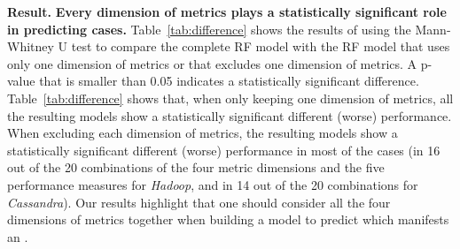 \noindent \textbf{Result.}
\textbf{Every dimension of metrics plays a statistically significant role in predicting \inconsistent cases.}
Table~\ref{tab:difference} shows the results of using the Mann-Whitney U test to compare the complete RF model with the RF model that uses only one dimension of metrics or that excludes one dimension of metrics. A p-value that is smaller than 0.05 indicates a statistically significant difference.
Table~\ref{tab:difference} shows that, when only keeping one dimension of metrics, all the resulting models show a statistically significant different (worse) performance.
When excluding each dimension of metrics, the resulting models show a statistically significant different (worse) performance in most of the cases (in 16 out of the 20 combinations of the four metric dimensions and the five performance measures for \emph{Hadoop}, and in 14 out of the 20 combinations for \emph{Cassandra}).
Our results highlight that one should consider all the four dimensions of metrics together when building a model to predict which \instance manifests an \inconsistent.


\begin{comment}
\textbf{All the dimensions have a good explanatory power in predicting \inconsistent cases}, as all of the one dimension's models have an AUC higher than 0.50 (i.e., which corresponds to the AUC of a random guess), as shown in Figure~\ref{fig:importance-dimenssion-keep-hadoop} and \ref{fig:importance-dimenssion-keep-cassandra}. %
The model that combines all the dimensions show a better AUC performance compared to the one-dimension models, which indicates that combining all the dimensions show an AUC improvement over each dimension in any performance metric. 
Removing one dimension at a time shows similar results. In fact, all the dimensions are important in predicting \inconsistent for \instance instances, as shown in Figure~\ref{fig:importance-dimenssion-remove-hadoop} and~\ref{fig:importance-dimenssion-remove-cassandra}. \med{double check if this is correct:}Finally, the AUC of all the one-dimension models as well as the models that use all except one dimension are statistically significantly (Mann-Whitney U test; $\alpha$ = 0.05) %
different from the model that combines all the metrics. %
\end{comment}

